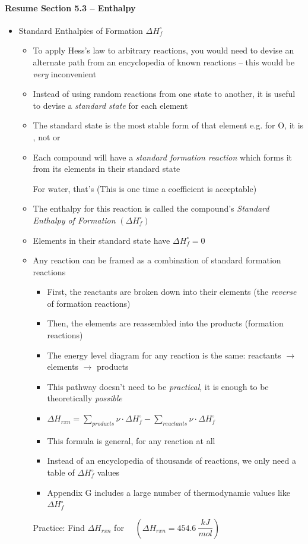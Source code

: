 \documentclass[12pt, openany, letterpaper]{memoir}
\begin{document}
\paragraph*{Resume Section 5.3 -- Enthalpy}
\begin{itemize}
  \item Standard Enthalpies of Formation $\Delta H_{f}^\circ$
    \begin{itemize}
      \item To apply Hess's law to arbitrary reactions, you would need to devise an alternate path from an encyclopedia of known reactions -- this would be \emph{very} inconvenient
      \item Instead of using random reactions from one state to another, it is useful to devise a \emph{standard state} for each element
      \item The standard state is the most stable form of that element e.g. for O, it is , not  or 
      \item Each compound will have a \emph{standard formation reaction} which forms it from its elements in their standard state

            For water, that's  \hspace{1em} (This is one time a  coefficient is acceptable)
      \item The enthalpy for this reaction is called the compound's \emph{Standard Enthalpy of Formation} $\left(\Delta H^\circ_f\right)$
      \item Elements in their standard state have $\Delta H^\circ_f = 0$
      \item Any reaction can be framed as a combination of standard formation reactions
        \begin{itemize}
          \item First, the reactants are broken down into their elements (the \emph{reverse} of formation reactions)
          \item Then, the elements are reassembled into the products (formation reactions)
          \item The energy level diagram for any reaction is the same: reactants $\rightarrow$ elements $\rightarrow$ products
          \item This pathway doesn't need to be \emph{practical}, it is enough to be theoretically \emph{possible}
          \item $\Delta H_{rxn}=\sum\limits_{products}\nu\cdot\Delta H^\circ_f - \sum\limits_{reactants}\nu\cdot\Delta H^\circ_f$
          \item This formula is general, for any reaction at all
          \item Instead of an encyclopedia of thousands of reactions, we only need a table of $\Delta H^\circ_f$ values
          \item Appendix G includes a large number of thermodynamic values like $\Delta H^\circ_f$
        \end{itemize}
        Practice: Find $\Delta H_{rxn}$ for~~  \hspace{1em} $\left(\Delta H_{rxn}=454.6~\dfrac{kJ}{mol}\right)$


\end{itemize}
\end{itemize}
\end{document}
